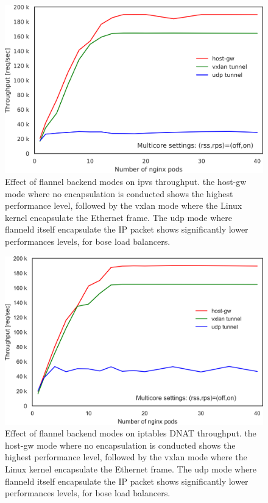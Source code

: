 \begin{figure}[h]
  \centering
  \includegraphics[width=0.9\columnwidth]{Figs/ipvs_flannel_mode}

  \centering
  \begin{minipage}{0.9\columnwidth}
    \caption[Effect of flannel backend modes on ipvs throughput]{
      Effect of flannel backend modes on ipvs throughput.
      the host-gw mode where no encapsulation is conducted shows the highest performance level,
      followed by the vxlan mode where the Linux kernel encapsulate the Ethernet frame.
      The udp mode where flanneld itself encapsulate the IP packet shows significantly lower performances levels, for bose load balancers.
    }
    \label{fig:ipvs_flannel_mode}
  \end{minipage}
\end{figure}

\begin{figure}[h]
    \centering
    \includegraphics[width=0.9\columnwidth]{Figs/iptables_flannel_mode}

  \centering
  \begin{minipage}{0.9\columnwidth}
    \caption[Effect of flannel backend modes on iptables DNAT throughput]{
      Effect of flannel backend modes on  iptables DNAT throughput.
      the host-gw mode where no encapsulation is conducted shows the highest performance level,
      followed by the vxlan mode where the Linux kernel encapsulate the Ethernet frame.
      The udp mode where flanneld itself encapsulate the IP packet shows significantly lower performances levels, for bose load balancers.
    }
    \label{fig:iptables_flannel_mode}
  \end{minipage}
\end{figure}

